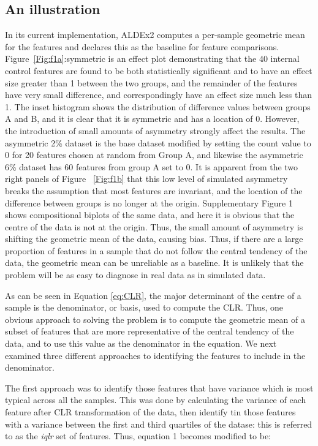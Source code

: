 \documentclass [10pt]{article}
\begin{document}
\subsection{An illustration}
\vskip-0.25cm
In its current implementation, ALDEx2 computes a per-sample geometric mean for the features and declares this as the baseline for feature comparisons. Figure~\ref{Fig:f1a}:symmetric is an effect plot demonstrating that the 40 internal control features are found to be both statistically significant and to have an effect size greater than 1 between the two groups, and the remainder of the features have very small difference, and correspondingly have an effect size much less than 1. The inset histogram shows the distribution of difference values between groups A and B, and it is clear that it is symmetric and has a location of 0. However, the introduction of small amounts of asymmetry strongly affect the results. The asymmetric 2\% dataset is the base dataset modified by setting the count value to 0 for 20 features chosen at random from Group A, and likewise the asymmetric 6\% dataset has 60 features from group A set to 0. It is apparent from the two right panels of Figure ~\ref{Fig:f1b} that this low level of simulated asymmetry breaks the assumption that most features are invariant, and the location of the difference between groups is no longer at the origin. Supplementary Figure 1 shows compositional biplots of the same data, and here it is obvious that the centre of the data is not at the origin. Thus, the small amount of asymmetry is shifting the geometric mean of the data, causing bias. Thus, if there are a large proportion of features in a sample that do not follow the central tendency of the data, the geometric mean can be unreliable as a baseline. It is unlikely that the problem will be as easy to diagnose in real data as in simulated data. 

As can be seen in Equation \ref{eq:CLR}, the major determinant of the centre of a sample is the denominator, or basis, used to compute the CLR. Thus, one obvious approach to solving the problem is to compute the geometric mean of a subset of features that are more representative of the central tendency of the data, and to use this value as the denominator in the equation. We next examined three different approaches to identifying the features to include in the denominator. 

The first approach was to identify those features that have variance which is most typical across all the samples. This was  done by calculating the variance of each feature after CLR transformation of the data, then identify tin those features with a variance between the first and third quartiles of the datase: this is referred to as the \textit{iqlr} set of features. Thus, equation 1 becomes modified to be:
\end{document}
